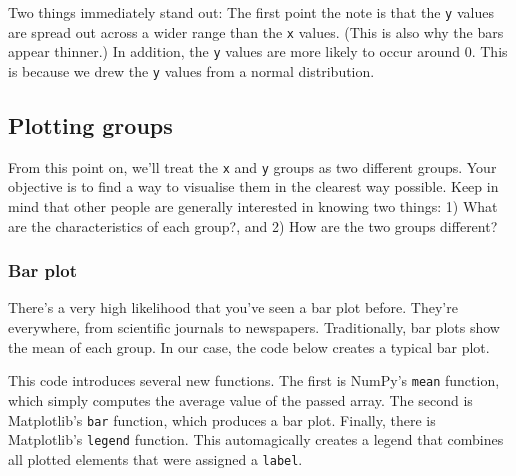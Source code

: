 \documentclass[11pt]{article}
\begin{document}
    Two things immediately stand out: The first point the note is that the
\texttt{y} values are spread out across a wider range than the
\texttt{x} values. (This is also why the bars appear thinner.) In
addition, the \texttt{y} values are more likely to occur around 0. This
is because we drew the \texttt{y} values from a normal distribution.

    \subsection{Plotting groups}\label{plotting-groups}

From this point on, we'll treat the \texttt{x} and \texttt{y} groups as
two different groups. Your objective is to find a way to visualise them
in the clearest way possible. Keep in mind that other people are
generally interested in knowing two things: 1) What are the
characteristics of each group?, and 2) How are the two groups different?

    \subsubsection{Bar plot}\label{bar-plot}

There's a very high likelihood that you've seen a bar plot before.
They're everywhere, from scientific journals to newspapers.
Traditionally, bar plots show the mean of each group. In our case, the
code below creates a typical bar plot.

This code introduces several new functions. The first is NumPy's
\texttt{mean} function, which simply computes the average value of the
passed array. The second is Matplotlib's \texttt{bar} function, which
produces a bar plot. Finally, there is Matplotlib's \texttt{legend}
function. This automagically creates a legend that combines all plotted
elements that were assigned a \texttt{label}.
\end{document}
